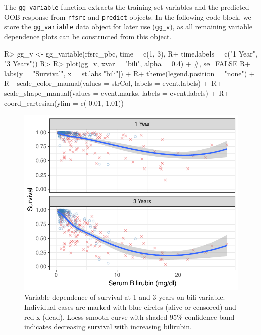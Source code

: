 \documentclass[article, nojss]{jss}
\begin{document}
The \texttt{gg\_variable} function extracts the training set variables
and the predicted OOB response from \texttt{rfsrc} and \texttt{predict}
objects. In the following code block, we store the \texttt{gg\_variable}
data object for later use (\texttt{gg\_v}), as all remaining variable
dependence plots can be constructed from this object.

\begin{Schunk}
\begin{Sinput}
R> gg_v <- gg_variable(rfsrc_pbc, time = c(1, 3),
R+                     time.labels = c("1 Year", "3 Years"))
R>
R> plot(gg_v, xvar = "bili", alpha = 0.4) + #, se=FALSE
R+   labs(y = "Survival", x = st.labs["bili"]) +
R+   theme(legend.position = "none") +
R+   scale_color_manual(values = strCol, labels = event.labels) +
R+   scale_shape_manual(values = event.marks, labels = event.labels) +
R+   coord_cartesian(ylim = c(-0.01, 1.01))
\end{Sinput}
\begin{figure}[!htb]

{\centering \includegraphics{rfs-variable-plotbili-1}

}

\caption[Variable dependence of survival at 1 and 3 years on bili variable]{Variable dependence of survival at 1 and 3 years on bili variable. Individual cases are marked with blue circles (alive or censored) and red x (dead). Loess smooth curve with shaded 95\% confidence band indicates decreasing survival with increasing bilirubin.}\label{fig:variable-plotbili}
\end{figure}
\end{Schunk}
\end{document}
